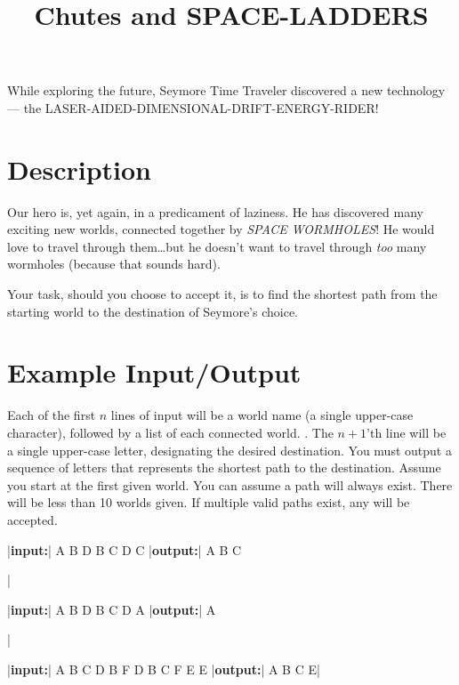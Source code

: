 \documentclass{../codeproblem}
\begin{document}
\title{Chutes and SPACE-LADDERS}

\begin{flavor}
  While exploring the future, Seymore Time Traveler discovered a new
  technology --- the LASER-AIDED-DIMENSIONAL-DRIFT-ENERGY-RIDER!
\end{flavor}

\section*{Description}
Our hero is, yet again, in a predicament of laziness. He has discovered
many exciting new worlds, connected together by \emph{SPACE WORMHOLES}! He
would love to travel through them\ldots but he doesn't want to travel
through \emph{too} many wormholes (because that sounds hard).

Your task, should you choose to accept it, is to find the shortest
path from the starting world to the destination of Seymore's choice.

\section*{Example Input/Output}

Each of the first $n$ lines of input will be a world name (a single
upper-case character), followed by a list of each connected world. 
. The $n+1$'th line will be a single upper-case
letter, designating the desired destination. You must output a
sequence of letters that represents the shortest path to the
destination. Assume you start at the first given world. You can assume
a path will always exist. There will be less than 10 worlds given.
If multiple valid paths exist, any will be accepted.


\begin{minipage}{.33\linewidth}
  \begin{example}
|\textbf{input:}|
A B D
B C D
C
|\textbf{output:}|
A B C


|\end{example}
\end{minipage}
\begin{minipage}{.33\linewidth}
\begin{example}
|\textbf{input:}|
A B D
B C D
A
|\textbf{output:}|
A


|\end{example}
\end{minipage}
\begin{minipage}{.33\linewidth}
\begin{example}
|\textbf{input:}|
A B C D
B F
D B C
F E
E
|\textbf{output:}|
A B C E|\end{example}
\end{minipage}
\end{document}
